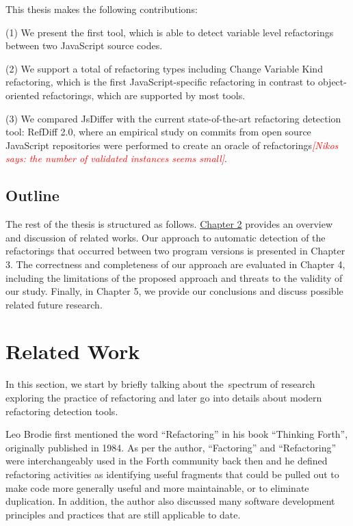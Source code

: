 \documentclass[letterpaper,12pt,onecolumn,final]{report}
\newcommand{\nikos}[1]{\textcolor{red}{{\it [Nikos says: #1]}}}
\begin{document}
This thesis makes the following contributions:

(1) We present the first tool, which is able to detect variable level refactorings between two JavaScript source codes.

(2) We support a total of \supportedRefTypesJsDiffer{} refactoring types including Change Variable Kind refactoring, which is the first JavaScript-specific refactoring in contrast to object-oriented refactorings, which are supported by most tools.

(3) We compared JsDiffer with the current state-of-the-art refactoring detection tool: RefDiff 2.0, where an empirical study on \evTotalCommits{} commits from \evTotalProjectCounts{} open source JavaScript repositories were performed to create an oracle of \oracleValidatedInstances{} refactorings\nikos{the number of validated instances seems small}.


\section{Outline}
\label{sec:outline}
The rest of the thesis is structured as follows. \hyperref[chap:relatedWork]{Chapter 2}  provides an overview and discussion of related works. Our approach to automatic detection of the refactorings that occurred between two program versions is presented in Chapter 3. The correctness and completeness of our approach are evaluated in Chapter 4, including the limitations of the proposed approach and threats to the validity of our study. Finally, in Chapter 5, we provide our conclusions and discuss possible related future research.


\chapter{Related Work}
\label{chap:relatedwork}

In this section, we start by briefly talking about the spectrum of research exploring the practice of refactoring and later go into details about modern refactoring detection tools.

Leo Brodie \cite{thinkingforth} first mentioned the word “Refactoring” in his book “Thinking Forth”, originally published in 1984. As per the author, “Factoring” and “Refactoring” were interchangeably used in the Forth community back then and he defined refactoring activities as identifying useful fragments that could be pulled out to make code more generally useful and more maintainable, or to eliminate duplication. In addition, the author also discussed many software development principles and practices that are still applicable to date.
\end{document}
